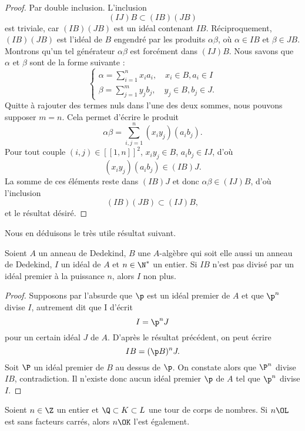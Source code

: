 \documentclass[a4paper, 12pt, oneside]{article}
\begin{document}
\begin{proof}
	Par double inclusion. L'inclusion $$(IJ)B \subset (IB)(JB)$$ est triviale, car $(IB)(JB)$ est un idéal contenant $IB$. Réciproquement, $(IB)(JB)$ est l'idéal de $B$ engendré par les produits $\alpha\beta$, où $\alpha \in IB$ et $\beta\in JB$. Montrons qu'un tel générateur $\alpha\beta$ est forcément dans $(IJ)B$. Nous savons que $\alpha$ et $\beta$ sont de la forme suivante :
	$$\begin{cases}
		\displaystyle \alpha = \sum_{i=1}^n x_i a_i, \quad x_i\in B, a_i \in I \\
		\displaystyle\beta = \sum_{j=1}^m y_j b_j, \quad y_j\in B, b_j \in J.
	\end{cases}$$
	Quitte à rajouter des termes nuls dans l'une des deux sommes, nous pouvons supposer $m=n$. Cela permet d'écrire le produit $$\alpha\beta = \sum_{i,j=1}^n (x_iy_j) (a_i b_j).$$ Pour tout couple $(i, j) \in [\![ 1, n]\!] ^2$, $x_iy_j \in B$, $a_i b_j\in IJ$, d'où $$(x_i y_j)(a_i b_j) \in (IB)J.$$ La somme de ces éléments reste dans $(IB)J$ et donc $\alpha \beta \in (IJ)B$, d'où l'inclusion $$(IB)(JB) \subset (IJ)B,$$ et le résultat désiré.
\end{proof}

Nous en déduisons le très utile résultat suivant.

\begin{fait}Soient $A$ un anneau de Dedekind, $B$ une $A$-algèbre qui soit elle aussi un anneau de Dedekind, $I$ un idéal de $A$ et $n\in \N^*$ un entier. Si $IB$ n'est pas divisé par un idéal premier à la puissance $n$, alors $I$ non plus.
\end{fait}

\begin{proof}
Supposons par l'absurde que $\p$ est un idéal premier de $A$ et que $\p^n$ divise $I$, autrement dit que I d'écrit $$I = \p^n J$$ pour un certain idéal $J$ de $A$. D'après le résultat précédent, on peut écrire $$IB = (\p B)^n J.$$ Soit $\P$ un idéal premier de $B$ au dessus de $\p$. On constate alors que $\P^n$ divise $IB$, contradiction. Il n'existe donc aucun idéal premier $\p$ de $A$ tel que $\p^n$ divise $I$.
\end{proof}

\begin{corollaire}Soient $n\in \Z$ un entier et $\Q\subset K\subset L$ une tour de corps de nombres. Si $n\OL$ est sans facteurs carrés, alors $n\OK$ l'est également.
\end{corollaire}
\end{document}
